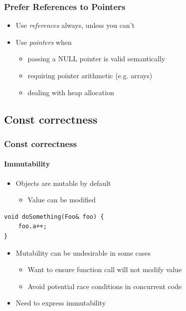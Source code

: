 \documentclass[table]{beamer}
\newcounter{rulecount}
\newcommand{\declarerule}{\textbf{\color{themeblue}{Rule \therulecount:}} }
\newcommand{\declarelesson}{\textbf{\color{themegreen}{Lesson:}} }
\begin{document}
\begin{frame}
    \frametitle{\declarerule Prefer References to Pointers}
    \fontsize{12pt}{14}\selectfont
    \begin{itemize}
        \item Use \emph{references} always, unless you can't
        \item Use \emph{pointers} when
            \begin{itemize}
    \fontsize{10pt}{11}\selectfont
                \item passing a NULL pointer is valid semantically
                \item requiring pointer arithmetic (e.g. arrays)
                \item dealing with heap allocation
            \end{itemize}
    \end{itemize}
\end{frame}


\subsection{Const correctness}
\frame{\subsectionpage}

\begin{frame}[fragile]
    \frametitle{\declarelesson Const correctness}
    \framesubtitle{Immutability}
    \begin{itemize}
        \item Objects are mutable by default
            \begin{itemize}
                \item Value can be modified
            \end{itemize}
    \end{itemize}
    \begin{lstlisting}[title=Passing mutable object]
void doSomething(Foo& foo) {
    foo.a++;
}
    \end{lstlisting}
    \begin{itemize}
        \item Mutability can be undesirable in some cases
            \begin{itemize}
                \item Want to ensure function call will not modify value
                \item Avoid potential race conditions in concurrent code
            \end{itemize}
        \item Need to express immutability
    \end{itemize}
\end{frame}
\end{document}
